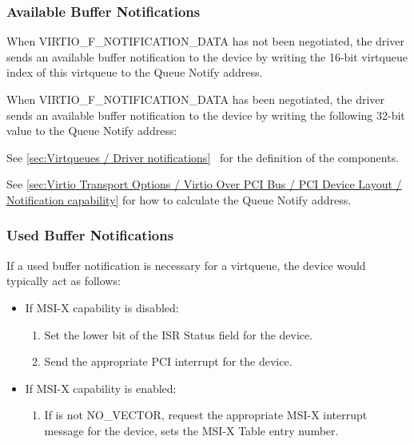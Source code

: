 \subsubsection{Available Buffer Notifications}\label{sec:Virtio Transport Options / Virtio Over PCI Bus / PCI-specific Initialization And Device Operation / Available Buffer Notifications}

When VIRTIO_F_NOTIFICATION_DATA has not been negotiated,
the driver sends an available buffer notification to the device by writing
the 16-bit virtqueue index
of this virtqueue to the Queue Notify address.

When VIRTIO_F_NOTIFICATION_DATA has been negotiated,
the driver sends an available buffer notification to the device by writing
the following 32-bit value to the Queue Notify address:


See \ref{sec:Virtqueues / Driver notifications}~
for the definition of the components.

See \ref{sec:Virtio Transport Options / Virtio Over PCI Bus / PCI Device Layout / Notification capability}
for how to calculate the Queue Notify address.

\subsubsection{Used Buffer Notifications}\label{sec:Virtio Transport Options / Virtio Over PCI Bus / PCI-specific Initialization And Device Operation / Used Buffer Notifications}

If a used buffer notification is necessary for a virtqueue, the device would typically act as follows:

\begin{itemize}
  \item If MSI-X capability is disabled:
    \begin{enumerate}
    \item Set the lower bit of the ISR Status field for the device.

    \item Send the appropriate PCI interrupt for the device.
    \end{enumerate}

  \item If MSI-X capability is enabled:
    \begin{enumerate}
    \item If  is not NO_VECTOR,
      request the appropriate MSI-X interrupt message for the
      device,  sets the MSI-X Table entry
      number.
    \end{enumerate}
\end{itemize}

